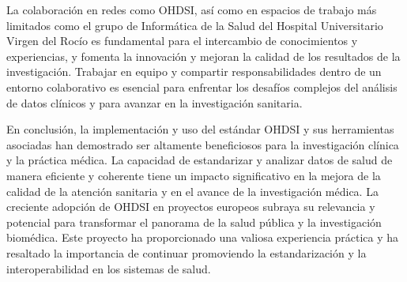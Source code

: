La colaboración en redes como OHDSI, así como en espacios de trabajo más limitados como el grupo de Informática de la Salud del Hospital Universitario Virgen del Rocío es fundamental para el intercambio de conocimientos y experiencias, y fomenta la innovación y mejoran la calidad de los resultados de la investigación. Trabajar en equipo y compartir responsabilidades dentro de un entorno colaborativo es esencial para enfrentar los desafíos complejos del análisis de datos clínicos y para avanzar en la investigación sanitaria.

En conclusión, la implementación y uso del estándar OHDSI y sus herramientas asociadas han demostrado ser altamente beneficiosos para la investigación clínica y la práctica médica. La capacidad de estandarizar y analizar datos de salud de manera eficiente y coherente tiene un impacto significativo en la mejora de la calidad de la atención sanitaria y en el avance de la investigación médica. La creciente adopción de OHDSI en proyectos europeos subraya su relevancia y potencial para transformar el panorama de la salud pública y la investigación biomédica. Este proyecto ha proporcionado una valiosa experiencia práctica y ha resaltado la importancia de continuar promoviendo la estandarización y la interoperabilidad en los sistemas de salud.
